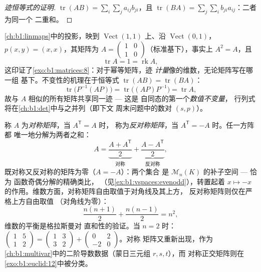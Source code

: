 \begin{proof}[迹恒等式的证明]
$\operatorname{tr}(AB) = \sum_i \sum_j a_{ij} b_{ji}$，且
$\operatorname{tr}(BA) = \sum_j \sum_i b_{ji} a_{ij}$：二者为同一个
二重和。
\end{proof}

\begin{example}[迹的应用]
\label{ex:b1:matrices:tracework}
\cref{ch:b1:linmaps}中的投影，映到
$\operatorname{Vect}(1,1)$ 上、沿 $\operatorname{Vect}(0,1)$，
$p(x, y) = (x, x)$，其矩阵为 $A = \begin{pmatrix} 1 & 0\\ 1 &
0\end{pmatrix}$（标准基下），事实上 $A^2 = A$，且
\[
\operatorname{tr} A = 1 = \operatorname{rk} A ,
\]
这印证了\cref{exo:b1:matrices:8}：对于幂等矩阵，迹
\emph{计量}像的维数，无论矩阵写在哪一组
基下。不变性的机理在于恒等式
$\operatorname{tr}(AB) = \operatorname{tr}(BA)$：
\[
\operatorname{tr}\bigl(P^{-1}(AP)\bigr) =
\operatorname{tr}\bigl((AP)P^{-1}\bigr) = \operatorname{tr} A ,
\]
故与 $A$ 相似的所有矩阵共享同一迹 --- 这是
自同态的第一个\emph{数值不变量}，
行列式将在\cref{ch:b1:det}中与之并列（即下文
周末问题中的数对 $(s, p)$）。
\end{example}

\begin{example}[对称加反对称]
\label{ex:b1:matrices:symsplit}
称 $A$ 为\emph{对称矩阵}，当 $A^{\mathsf T} = A$ 时，
称为\emph{反对称矩阵}，当 $A^{\mathsf T} = -A$ 时。任一方阵都
唯一地分解为两者之和：
\[
A = \underbrace{\frac{A + A^{\mathsf T}}{2}}_{\text{对称}}
+ \underbrace{\frac{A - A^{\mathsf T}}{2}}_{\text{反对称}},
\]
既对称又反对称的矩阵为零（$A = -A$）：两个集合
是 $\mathcal{M}_n(K)$ 的补子空间 --- 恰为
函数奇偶分解的精确类比，
（见\cref{ex:b1:vspaces:evenodd}），转置起着
$x \mapsto -x$ 的作用。维数方面，对称矩阵自由取值于对角线及其上方，
反对称矩阵则仅在严格上方自由取值
（对角线为零）：
\[
\frac{n(n+1)}{2} + \frac{n(n-1)}{2} = n^2 ,
\]
维数的平衡是格拉斯曼对
直和性的验证。当 $n = 2$ 时：$\begin{pmatrix} 1 & 5\\ 1 &
2\end{pmatrix} = \begin{pmatrix} 1 & 3\\ 3 & 2\end{pmatrix} +
\begin{pmatrix} 0 & 2\\ -2 & 0\end{pmatrix}$。对称
矩阵又重新出现，作为
\cref{ch:b1:multivar}中的二阶导数数据（蒙日三元组 $r, s, t$），而
对称正交矩阵则在
\cref{exo:b1:euclid:12}中被分类。
\end{example}

